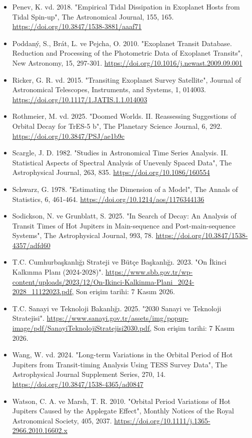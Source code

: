 \begin{itemize}[leftmargin=1em,itemsep=1pt]
\item Penev, K. vd. 2018. "Empirical Tidal Dissipation in Exoplanet Hosts from Tidal Spin-up", The Astronomical Journal, 155, 165. \url{https://doi.org/10.3847/1538-3881/aaaf71}
\item Poddaný, S., Brát, L. ve Pejcha, O. 2010. "Exoplanet Transit Database. Reduction and Processing of the Photometric Data of Exoplanet Transits", New Astronomy, 15, 297-301. \url{https://doi.org/10.1016/j.newast.2009.09.001}
\item Ricker, G. R. vd. 2015. "Transiting Exoplanet Survey Satellite", Journal of Astronomical Telescopes, Instruments, and Systems, 1, 014003. \url{https://doi.org/10.1117/1.JATIS.1.1.014003}
\item Rothmeier, M. vd. 2025. "Doomed Worlds. II. Reassessing Suggestions of Orbital Decay for TrES-5 b", The Planetary Science Journal, 6, 292. \url{https://doi.org/10.3847/PSJ/ae1b9c}
\item Scargle, J. D. 1982. "Studies in Astronomical Time Series Analysis. II. Statistical Aspects of Spectral Analysis of Unevenly Spaced Data", The Astrophysical Journal, 263, 835. \url{https://doi.org/10.1086/160554}
\item Schwarz, G. 1978. "Estimating the Dimension of a Model", The Annals of Statistics, 6, 461-464. \url{https://doi.org/10.1214/aos/1176344136}
\item Sodickson, N. ve Grunblatt, S. 2025. "In Search of Decay: An Analysis of Transit Times of Hot Jupiters in Main-sequence and Post-main-sequence Systems", The Astrophysical Journal, 993, 78. \url{https://doi.org/10.3847/1538-4357/adfd60}
\item T.C. Cumhurbaşkanlığı Strateji ve Bütçe Başkanlığı. 2023. "On İkinci Kalkınma Planı (2024-2028)". \url{https://www.sbb.gov.tr/wp-content/uploads/2023/12/On-Ikinci-Kalkinma-Plani_2024-2028_11122023.pdf,} Son erişim tarihi: 7 Kasım 2026.
\item T.C. Sanayi ve Teknoloji Bakanlığı. 2025. "2030 Sanayi ve Teknoloji Stratejisi". \url{https://www.sanayi.gov.tr/assets/img/popup-image/pdf/SanayiTeknolojiStratejisi2030.pdf,} Son erişim tarihi: 7 Kasım 2026.
\item Wang, W. vd. 2024. "Long-term Variations in the Orbital Period of Hot Jupiters from Transit-timing Analysis Using TESS Survey Data", The Astrophysical Journal Supplement Series, 270, 14. \url{https://doi.org/10.3847/1538-4365/ad0847}
\item Watson, C. A. ve Marsh, T. R. 2010. "Orbital Period Variations of Hot Jupiters Caused by the Applegate Effect", Monthly Notices of the Royal Astronomical Society, 405, 2037. \url{https://doi.org/10.1111/j.1365-2966.2010.16602.x}

\end{itemize}
